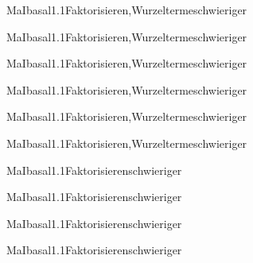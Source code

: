 \documentclass[12pt]{article}
\begin{document}
    \begin{Add}{MaI}{basal1.1}{Faktorisieren,Wurzelterme}{schwieriger}
    \solution{ }
    \end{Add}
    \begin{Add}{MaI}{basal1.1}{Faktorisieren,Wurzelterme}{schwieriger}
    \end{Add}
    

    \begin{Add}{MaI}{basal1.1}{Faktorisieren,Wurzelterme}{schwieriger}
    \solution{ }
    \end{Add}
    \begin{Add}{MaI}{basal1.1}{Faktorisieren,Wurzelterme}{schwieriger}
    \end{Add}
    

    \begin{Add}{MaI}{basal1.1}{Faktorisieren,Wurzelterme}{schwieriger}
    \solution{ }
    \end{Add}
    \begin{Add}{MaI}{basal1.1}{Faktorisieren,Wurzelterme}{schwieriger}
    \end{Add}
    

    \begin{Add}{MaI}{basal1.1}{Faktorisieren}{schwieriger}
    \solution{ }
    \end{Add}
    \begin{Add}{MaI}{basal1.1}{Faktorisieren}{schwieriger}
    \end{Add}
    

    \begin{Add}{MaI}{basal1.1}{Faktorisieren}{schwieriger}
    \solution{ }
    \end{Add}
    \begin{Add}{MaI}{basal1.1}{Faktorisieren}{schwieriger}
    \end{Add}
    
\end{document}
